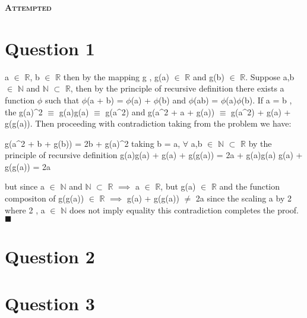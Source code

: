 \documentclass[a4paper, 12pt]{article}
\begin{document}
\begin{center}
    \fontsize{24pt}{10pt}\selectfont
    \textsc{\textbf{Attempted}}
\end{center}

\section{Question 1}
a  $\in$  $\mathbb{R}$, b  $\in$  $\mathbb{R}$ then by  the mapping g , g(a)  $\in$ $\mathbb{R}$ and
g(b) $\in$ $\mathbb{R}$. Suppose a,b $\in$ $\mathbb{N}$ and $\mathbb{N}$ $\subset$ $\mathbb{R}$, 
then by the principle of recursive definition there exists a function $\phi$ such that
$\phi$(a + b) = $\phi$(a) + $\phi$(b) and $\phi$(ab) = $\phi$(a)$\phi$(b).
If a = b , the g(a)^2 $\equiv$ g(a)g(a) $\equiv$ g(a^2)  and g(a^2 + a + g(a)) $\equiv$ g(a^2) + g(a) + g(g(a)).
Then proceeding with contradiction taking from the problem we have:
\begin{center}
    g(a^2 + b + g(b)) = 2b + g(a)^2
    taking b = a, $\forall$ a,b $\in$ $\mathbb{N}$ $\subset$ $\mathbb{R}$
    by the principle of recursive definition
    g(a)g(a) + g(a) + g(g(a)) = 2a + g(a)g(a)
    g(a) + g(g(a)) = 2a
\end{center}
but since a $\in$ $\mathbb{N}$ and $\mathbb{N}$ $\subset$ $\mathbb{R}$ $\implies $ a $\in$ $\mathbb{R}$, 
but g(a) $\in$ $\mathbb{R}$ and the function compositon of g(g(a)) $\in$ $\mathbb{R}$ $\implies $ g(a) + g(g(a)) $\neq$  2a
since the scaling a by 2 where 2 , a $\in$ $\mathbb{N}$ does not imply equality this contradiction completes the proof. $\blacksquare$ 


\newpage

\section{Question 2}
\blacksquare \blacksquare 
\newpage

\section{Question 3}
\end{document}
